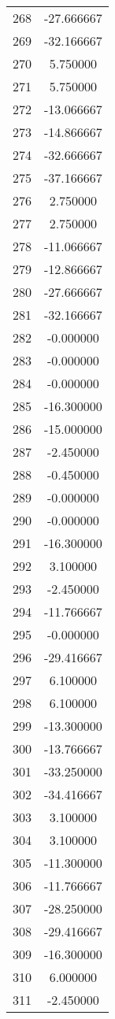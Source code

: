 \documentclass[12pt]{article}
\begin{document}
\begin{longtable}{@{}cc@{}}
268 & -27.666667 \\
269 & -32.166667 \\
270 & 5.750000 \\
271 & 5.750000 \\
272 & -13.066667 \\
273 & -14.866667 \\
274 & -32.666667 \\
275 & -37.166667 \\
276 & 2.750000 \\
277 & 2.750000 \\
278 & -11.066667 \\
279 & -12.866667 \\
280 & -27.666667 \\
281 & -32.166667 \\
282 & -0.000000 \\
283 & -0.000000 \\
284 & -0.000000 \\
285 & -16.300000 \\
286 & -15.000000 \\
287 & -2.450000 \\
288 & -0.450000 \\
289 & -0.000000 \\
290 & -0.000000 \\
291 & -16.300000 \\
292 & 3.100000 \\
293 & -2.450000 \\
294 & -11.766667 \\
295 & -0.000000 \\
296 & -29.416667 \\
297 & 6.100000 \\
298 & 6.100000 \\
299 & -13.300000 \\
300 & -13.766667 \\
301 & -33.250000 \\
302 & -34.416667 \\
303 & 3.100000 \\
304 & 3.100000 \\
305 & -11.300000 \\
306 & -11.766667 \\
307 & -28.250000 \\
308 & -29.416667 \\
309 & -16.300000 \\
310 & 6.000000 \\
311 & -2.450000 \\

\end{longtable}
\end{document}
